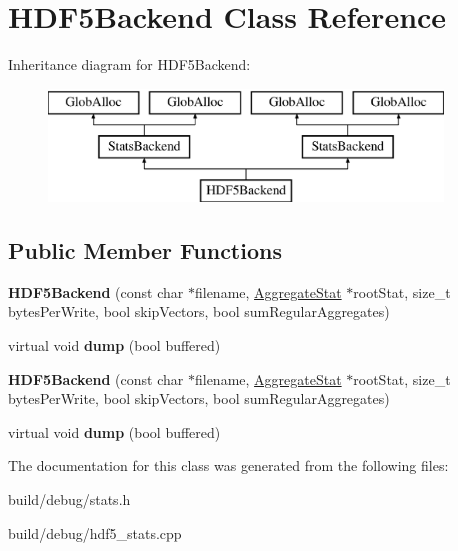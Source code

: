 \hypertarget{classHDF5Backend}{\section{H\-D\-F5\-Backend Class Reference}
\label{classHDF5Backend}
}
Inheritance diagram for H\-D\-F5\-Backend\-:\begin{figure}[H]
\begin{center}
\leavevmode
\includegraphics[height=3.000000cm]{classHDF5Backend}
\end{center}
\end{figure}
\subsection*{Public Member Functions}
\begin{DoxyCompactItemize}
\item 
\hypertarget{classHDF5Backend_ac12e84e1c4cc5ce59b9fe94192587fdd}{{\bfseries H\-D\-F5\-Backend} (const char $\ast$filename, \hyperlink{classAggregateStat}{Aggregate\-Stat} $\ast$root\-Stat, size\-\_\-t bytes\-Per\-Write, bool skip\-Vectors, bool sum\-Regular\-Aggregates)}\label{classHDF5Backend_ac12e84e1c4cc5ce59b9fe94192587fdd}

\item 
\hypertarget{classHDF5Backend_aa30ec81d35765cc8abbf2f1653070e25}{virtual void {\bfseries dump} (bool buffered)}\label{classHDF5Backend_aa30ec81d35765cc8abbf2f1653070e25}

\item 
\hypertarget{classHDF5Backend_ac12e84e1c4cc5ce59b9fe94192587fdd}{{\bfseries H\-D\-F5\-Backend} (const char $\ast$filename, \hyperlink{classAggregateStat}{Aggregate\-Stat} $\ast$root\-Stat, size\-\_\-t bytes\-Per\-Write, bool skip\-Vectors, bool sum\-Regular\-Aggregates)}\label{classHDF5Backend_ac12e84e1c4cc5ce59b9fe94192587fdd}

\item 
\hypertarget{classHDF5Backend_a247f0fb5d230556df74f36da8cc78077}{virtual void {\bfseries dump} (bool buffered)}\label{classHDF5Backend_a247f0fb5d230556df74f36da8cc78077}

\end{DoxyCompactItemize}


The documentation for this class was generated from the following files\-:\begin{DoxyCompactItemize}
\item 
build/debug/stats.\-h\item 
build/debug/hdf5\-\_\-stats.\-cpp\end{DoxyCompactItemize}
